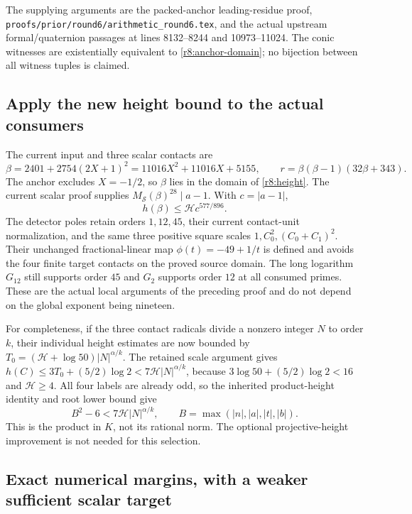 The supplying arguments are the packed-anchor leading-residue proof,
\texttt{proofs/prior/round6/arithmetic\_round6.tex}, and the actual
upstream formal/quaternion passages at lines 8132--8244 and
10973--11024. The conic witnesses are existentially equivalent to
\eqref{r8:anchor-domain}; no bijection between all witness tuples is
claimed.

\subsection{Apply the new height bound to the actual consumers}

The current input and three scalar contacts are
\[
 \beta=2401+2754(2X+1)^2
       =11016X^2+11016X+5155,
 \qquad r=\beta(\beta-1)(32\beta+343).
\]
The anchor excludes $X=-1/2$, so $\beta$ lies in the domain of
\eqref{r8:height}. The current scalar proof supplies
$M_{\mathcal S}(\beta)^{28}\mid a-1$. With $c=|a-1|$,
\[
 h(\beta)\le\mathcal H c^{577/896}.
\]
The detector poles retain orders $1,12,45$, their current contact-unit
normalization, and the same three positive square scales
$1,C_0^2,(C_0+C_1)^2$. Their unchanged fractional-linear map
$\phi(t)=-49+1/t$ is defined and avoids the four finite target contacts
on the proved source domain. The long logarithm $G_{12}$ still supports
order $45$ and $G_2$ supports order $12$ at all consumed primes.
These are the actual local arguments of the preceding proof and do not
depend on the global exponent being nineteen.

For completeness, if the three contact radicals divide a nonzero integer
$N$ to order $k$, their individual height estimates are now bounded by
$T_0=(\mathcal H+\log50)|N|^{\alpha/k}$.
The retained scale argument gives
$h(C)\le3T_0+(5/2)\log2<7\mathcal H|N|^{\alpha/k}$,
because $3\log50+(5/2)\log2<16$ and $\mathcal H\ge4$.
All four labels are already odd, so the inherited product-height
identity and root lower bound give
\begin{equation}\label{r8:transfer}
 B^2-6<7\mathcal H|N|^{\alpha/k},\qquad
 B=\max(|n|,|a|,|t|,|b|).
\end{equation}
This is the product in $K$, not its rational norm. The optional
projective-height improvement is not needed for this selection.

\subsection{Exact numerical margins, with a weaker sufficient scalar target}


